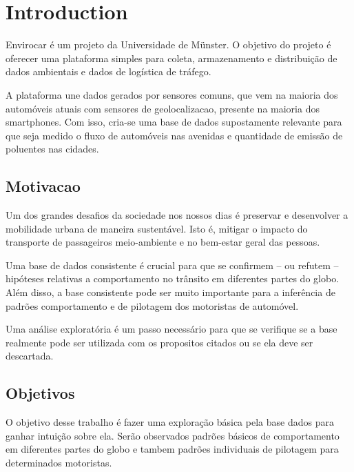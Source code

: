 \documentclass[10pt, conference]{IEEEtran}
\begin{document}
\IEEEpeerreviewmaketitle





\section{Introduction}
Envirocar é um projeto da Universidade de Münster. O objetivo 
do projeto é oferecer uma plataforma simples para coleta, 
armazenamento e distribuição de dados ambientais e dados de logística
de tráfego. 

A plataforma une dados gerados por sensores comuns,
que vem na maioria dos automóveis atuais com sensores de 
geolocalizacao, presente na maioria dos smartphones. Com isso,
cria-se uma base de dados supostamente relevante para que seja medido o fluxo de automóveis
nas avenidas e quantidade de emissão de poluentes nas cidades. 

\subsection{Motivacao}
%

Um dos grandes desafios da sociedade nos nossos dias é preservar
e desenvolver a mobilidade urbana de maneira sustentável. Isto é,
mitigar o impacto do transporte de passageiros meio-ambiente e no
bem-estar geral das pessoas.

Uma base de dados consistente é crucial para que se confirmem
-- ou refutem -- hipóteses relativas a comportamento no trânsito
em diferentes partes do globo. Além disso, a base consistente
pode ser muito importante para a inferência de padrões comportamento 
e de pilotagem dos motoristas de automóvel. 

Uma análise exploratória é um passo necessário para que se verifique
se a base realmente pode ser utilizada com os propositos citados 
ou se ela deve ser descartada.


\subsection{Objetivos}
%
O objetivo desse trabalho é fazer uma exploração básica pela base dados
para ganhar intuição sobre ela. Serão observados padrões básicos de 
comportamento em diferentes partes do globo e tambem padrões individuais
de pilotagem para determinados motoristas.
\end{document}
